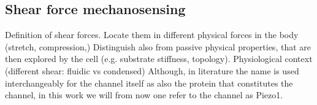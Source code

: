 \subsection{Shear force mechanosensing}
Definition of shear forces. Locate them in different physical forces in the body (stretch, compression,) Distinguish also from passive physical properties, that are then explored by the cell (e.g. substrate stiffness, topology).
Physiological context (different shear: fluidic vs condensed)
Although, in literature the name \Piezo{} is used interchangeably for the channel itself as also the protein that constitutes the channel, in this work we will from now one refer to the channel as Piezo1.


